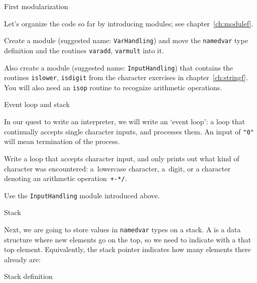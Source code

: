  {First modularization}

Let's organize the code so far by introducing modules;
see chapter~\ref{ch:modulef}.

\begin{exercise}
  \label{ex:f-named-var-mod}
  Create a module (suggested name: \lstinline{VarHandling}) and
  move the \lstinline{namedvar} type definition and
  the routines \lstinline{varadd}, \lstinline{varmult}
  into it.
\end{exercise}

\begin{exercise}
  \label{ex:f-named-var-mod}
  Also create a module (suggested name: \lstinline{InputHandling})
  that contains
  the routines \lstinline{islower}, \lstinline{isdigit}
  from the character exercises in chapter~\ref{ch:stringf}.
  You will also need an \lstinline{isop} routine to recognize
  arithmetic operations.
\end{exercise}

 {Event loop and stack}

In our quest to write an interpreter, we will write an
`event loop': a loop that continually accepts single character inputs,
and processes them.
An input of \lstinline{"0"} will mean termination of the process.

\begin{exercise}
  \label{ex:f-var-event-loop}
  Write a loop that accepts character input,
  and only prints out what kind of character was encountered:
  a~lowercase character, a~digit, or a character denoting
  an arithmetic operation~\lstinline|+-*/|.


  Use the \lstinline{InputHandling} module introduced above.
\end{exercise}

 {Stack}

Next, we are going to  store values in \lstinline{namedvar} types on a stack.
A  is a data structure where new elements go on the top,
so we need to indicate with a 
that top element.
Equivalently, the stack pointer indicates how many elements there already are:

\begin{block}{Stack definition}
  \label{sl:f-var-stack-def}
\end{block}


